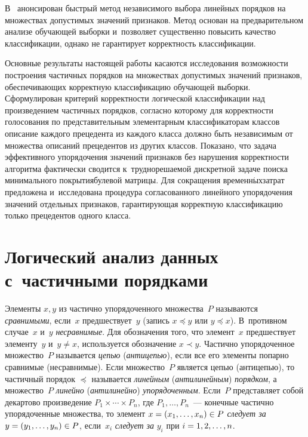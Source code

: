 \begin{multicols}{2}
  В~\cite{7-duk} анонсирован быстрый метод независимого выбора линейных 
порядков на множествах допустимых значений признаков. Метод основан на 
предварительном анализе обучающей выборки и~позволяет существенно 
повысить качество классификации, однако не гарантирует корректность 
классификации.
  
  Основные результаты настоящей работы касаются исследования 
возможности построения час\-тич\-ных порядков на множествах допустимых 
значений признаков, обес\-пе\-чи\-ва\-ющих корректную классификацию обучающей 
выборки. Сформулирован критерий кор\-рект\-ности логической классификации 
над произведением час\-тич\-ных порядков, согласно которому для корректности 
голосования по пред\-ста\-ви\-тель\-ным элементарным классификаторам классов 
описание каж\-до\-го прецедента из каж\-до\-го класса долж\-но быть независимым от 
множества описаний прецедентов из других классов. Показано, что задача 
эффективного упорядочения значений признаков без нарушения корректности 
алгоритма фактически сводится к~труднорешаемой дис\-крет\-ной задаче поиска 
минимального покрытия\linebreak булевой мат\-ри\-цы. Для сокращения 
временн$\acute{\mbox{ы}}$х\linebreak затрат предложена и~исследована процедура 
согласованного линейного упорядочения значений отдельных признаков, 
га\-ран\-ти\-ру\-ющая корректную классификацию только прецедентов одного класса. 
  
\section{Логический анализ данных с~частичными порядками}

  Элементы $x,y$ из частично упорядоченного множества~$P$ называются 
\textit{сравнимыми}, если~$x$ пред\-шест\-ву\-ет~$y$ (запись $x\preceq y$ или 
$y\preceq x$). В~противном случае~$x$ и~$y$ \textit{несравнимые}. Для 
обозначения того, что элемент~$x$ предшествует элементу~$y$ и~$y\not= x$, 
используется обозначение $x\prec y$. Частично упорядоченное множество~$P$ 
называется \textit{цепью} (\textit{антицепью}), если все его элементы попарно 
сравнимые (несравнимые). Если множество~$P$ является цепью (антицепью), 
то частичный порядок $\preceq$ называется \textit{линейным} 
(\textit{антилинейным}) \textit{порядком}, а множество~$P$ \textit{линейно} 
(\textit{антилинейно}) \textit{упорядоченным}. Если~$P$ представляет собой 
декартово произведение $P_1\times \cdots\times P_n$, где $P_1, \ldots , P_n$~--- 
конечные частично упорядоченные множества, то элемент $x\hm= (x_1, \ldots , 
x_n)\hm\in P$ \textit{следует за} $y\hm= (y_1,\ldots , y_n)\hm\in P$, если~$x_i$ 
\textit{следует за} $y_i$ при $i\hm=1,2,\ldots , n$. 
  

\end{multicols}
